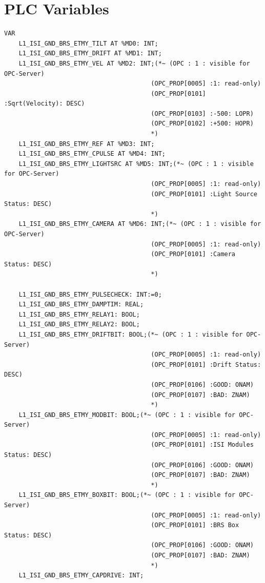 \documentclass{article}
\begin{document}
\section{PLC Variables}
\begin{lstlisting}
VAR
	L1_ISI_GND_BRS_ETMY_TILT AT %MD0: INT;
	L1_ISI_GND_BRS_ETMY_DRIFT AT %MD1: INT;
	L1_ISI_GND_BRS_ETMY_VEL AT %MD2: INT;(*~ (OPC : 1 : visible for OPC-Server) 
										(OPC_PROP[0005] :1: read-only)
										(OPC_PROP[0101] :Sqrt(Velocity): DESC)
										(OPC_PROP[0103] :-500: LOPR)
										(OPC_PROP[0102] :+500: HOPR)
										*)
	L1_ISI_GND_BRS_ETMY_REF AT %MD3: INT;		
	L1_ISI_GND_BRS_ETMY_CPULSE AT %MD4: INT;
	L1_ISI_GND_BRS_ETMY_LIGHTSRC AT %MD5: INT;(*~ (OPC : 1 : visible for OPC-Server)
										(OPC_PROP[0005] :1: read-only)
										(OPC_PROP[0101] :Light Source Status: DESC)
										*)
	L1_ISI_GND_BRS_ETMY_CAMERA AT %MD6: INT;(*~ (OPC : 1 : visible for OPC-Server)
										(OPC_PROP[0005] :1: read-only)
										(OPC_PROP[0101] :Camera Status: DESC)
										*)
	
	L1_ISI_GND_BRS_ETMY_PULSECHECK: INT:=0;
	L1_ISI_GND_BRS_ETMY_DAMPTIM: REAL;
	L1_ISI_GND_BRS_ETMY_RELAY1: BOOL;
	L1_ISI_GND_BRS_ETMY_RELAY2: BOOL;
	L1_ISI_GND_BRS_ETMY_DRIFTBIT: BOOL;(*~ (OPC : 1 : visible for OPC-Server)
										(OPC_PROP[0005] :1: read-only)
										(OPC_PROP[0101] :Drift Status: DESC)
										(OPC_PROP[0106] :GOOD: ONAM)
										(OPC_PROP[0107] :BAD: ZNAM)
										*)
	L1_ISI_GND_BRS_ETMY_MODBIT: BOOL;(*~ (OPC : 1 : visible for OPC-Server)
										(OPC_PROP[0005] :1: read-only)
										(OPC_PROP[0101] :ISI Modules Status: DESC)
										(OPC_PROP[0106] :GOOD: ONAM)
										(OPC_PROP[0107] :BAD: ZNAM)
										*)
	L1_ISI_GND_BRS_ETMY_BOXBIT: BOOL;(*~ (OPC : 1 : visible for OPC-Server)
										(OPC_PROP[0005] :1: read-only)
										(OPC_PROP[0101] :BRS Box Status: DESC)
										(OPC_PROP[0106] :GOOD: ONAM)
										(OPC_PROP[0107] :BAD: ZNAM)
										*)
	L1_ISI_GND_BRS_ETMY_CAPDRIVE: INT;
		

\end{lstlisting}
\end{document}
